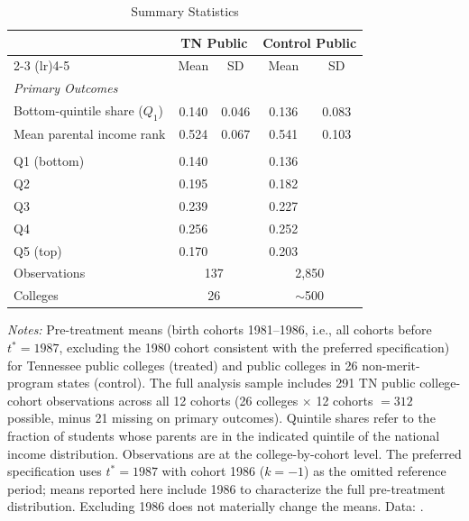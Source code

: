 \begin{table}[H]
\centering
\begin{threeparttable}
\caption{Summary Statistics}
\label{tab:summary_stats}
\begin{tabular}{lcccc}
\toprule
 & \multicolumn{2}{c}{TN Public} & \multicolumn{2}{c}{Control Public} \\
\cmidrule(lr){2-3} \cmidrule(lr){4-5}
 & Mean & SD & Mean & SD \\
\midrule
\multicolumn{5}{l}{\textit{Primary Outcomes}} \\
\quad Bottom-quintile share ($Q_1$) & 0.140 & 0.046 & 0.136 & 0.083 \\
\quad Mean parental income rank & 0.524 & 0.067 & 0.541 & 0.103 \\
\addlinespace
\multicolumn{5}{l}{\textit{Quintile Shares}} \\
\quad Q1 (bottom) & 0.140 & & 0.136 & \\
\quad Q2 & 0.195 & & 0.182 & \\
\quad Q3 & 0.239 & & 0.227 & \\
\quad Q4 & 0.256 & & 0.252 & \\
\quad Q5 (top) & 0.170 & & 0.203 & \\
\addlinespace
Observations & \multicolumn{2}{c}{137} & \multicolumn{2}{c}{2,850} \\
Colleges & \multicolumn{2}{c}{26} & \multicolumn{2}{c}{$\sim$500} \\
\bottomrule
\end{tabular}
\begin{tablenotes}[flushleft]
\footnotesize
\item \textit{Notes:} Pre-treatment means (birth cohorts 1981--1986,
  i.e., all cohorts before $t^* = 1987$, excluding the 1980 cohort
  consistent with the preferred specification) for Tennessee public
  colleges (treated) and public colleges in 26 non-merit-program states
  (control). The full analysis sample includes 291 TN
  public college-cohort observations across all 12 cohorts (26 colleges
  $\times$ 12 cohorts $= 312$ possible, minus 21 missing on primary
  outcomes). Quintile shares refer to the fraction of students whose
  parents are in the indicated quintile of the national income
  distribution. Observations are at the college-by-cohort level.
  The preferred specification uses $t^* = 1987$ with cohort 1986
  ($k = -1$) as the omitted reference period; means reported here
  include 1986 to characterize the full pre-treatment distribution.
  Excluding 1986 does not materially change the means.
  Data: \textcite{chetty2020mobility}.
\end{tablenotes}
\end{threeparttable}
\end{table}


